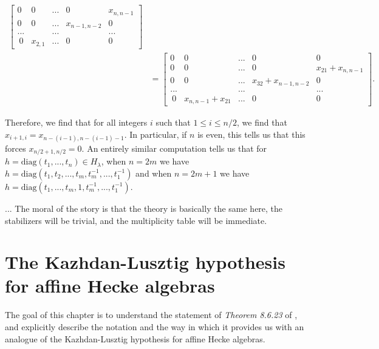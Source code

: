 \documentclass{memoir}
\newcommand{\tx}{\text}
\theoremstyle{definition}
\begin{document}
\begin{align*}
\begin{bmatrix}
0 & 0 & ... & 0 & x_{n, n-1} \\
0 & 0 & ... & x_{n-1, n-2} & 0 \\
... & & ... & & ...\\\
0 & x_{2, 1} & ... & 0 & 0
\end{bmatrix}\\
&=\begin{bmatrix}
	0 & 0 & ... & 0 & 0 \\
	0 & 0 & ... & 0 & x_{21}+x_{n, n-1} \\
	0 & 0 & ... & x_{32}+x_{n-1, n-2} & 0 \\
	... & & ... & & ...\\\
	0 & x_{n, n-1}+x_{21} & ... & 0 & 0
\end{bmatrix}.
	\end{align*}
	
	Therefore, we find that for all integers $i$ such that $1\leq i\leq n/2$, we find that $x_{i+1, i}=x_{n-(i-1), n-(i-1)-1}$.  
	In particular, if $n$ is even, this tells us that this forces $x_{n/2+1, n/2}=0$.  
	An entirely similar computation tells us that for $h=\tx{diag}(t_1, ..., t_n)\in H_\lambda$, when $n=2m$ we have $h=\tx{diag}(t_1, t_2, ..., t_m, t_m^{-1}, ..., t_1^{-1})$ and when $n=2m+1$ we have $h=\tx{diag}(t_1, ..., t_m, 1, t_m^{-1}, ..., t_1^{-1})$.  
	
	... The moral of the story is that the theory is basically the same here, the stabilizers will be trivial, and the multiplicity table will be immediate. 
	
	
	
	
	
	
	
	
	
	
	
	
	
	
	
	
	
	
	
	
	
	
	
	
	
	\chapter{The Kazhdan-Lusztig hypothesis for affine Hecke algebras}
	
	The goal of this chapter is to understand the statement of \emph{Theorem 8.6.23} of \cite{Chr}, and explicitly describe the notation and the way in which it provides us with an analogue of the Kazhdan-Lusztig hypothesis for affine Hecke algebras.  
	
\end{document}
